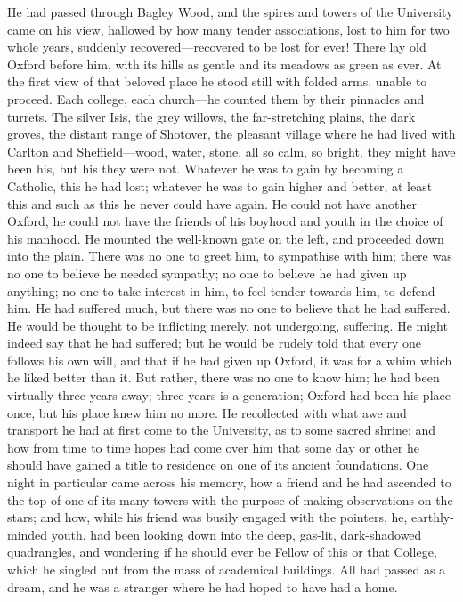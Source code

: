 He had passed through Bagley Wood, and the spires and towers of the
University came on his view, hallowed by how many tender associations,
lost to him for two whole years, suddenly recovered—recovered to be
lost for ever! There lay old Oxford before him, with its hills as
gentle and its meadows as green as ever. At the first view of that
beloved place he stood still with folded arms, unable to proceed. Each
college, each church—he counted them by their pinnacles and turrets.
The silver Isis, the grey willows, the far-stretching plains, the dark
groves, the distant range of Shotover, the pleasant village where he
had lived with Carlton and Sheffield—wood, water, stone, all so
calm, so bright, they might have been his, but his they were not. Whatever he was to gain by becoming a Catholic, this he had lost;
whatever he was to gain higher and better, at least this and such as
this he never could have again. He could not have another Oxford, he
could not have the friends of his boyhood and youth in the choice of
his manhood. He mounted the well-known gate on the left, and proceeded
down into the plain. There was no one to greet him, to sympathise with
him; there was no one to believe he needed sympathy; no one to believe
he had given up anything; no one to take interest in him, to feel
tender towards him, to defend him. He had suffered much, but there was
no one to believe that he had suffered. He would be thought to be
inflicting merely, not undergoing, suffering. He might indeed say that
he had suffered; but he would be rudely told that every one follows
his own will, and that if he had given up Oxford, it was for a whim
which he liked better than it. But rather, there was no one to know
him; he had been virtually three years away; three years is a
generation; Oxford had been his place once, but his place knew him no
more. He recollected with what awe and transport he had at first come
to the University, as to some sacred shrine; and how from time to time
hopes had come over him that some day or other he should have gained a
title to residence on one of its ancient foundations. One night in
particular came across his memory, how a friend and he had ascended to
the top of one of its many towers with the purpose of making
observations on the stars; and how, while his friend was busily
engaged with the pointers, he, earthly-minded youth, had been looking down into the deep, gas-lit, dark-shadowed quadrangles, and
wondering if he should ever be Fellow of this or that College, which
he singled out from the mass of academical buildings. All had passed
as a dream, and he was a stranger where he had hoped to have had a
home.

